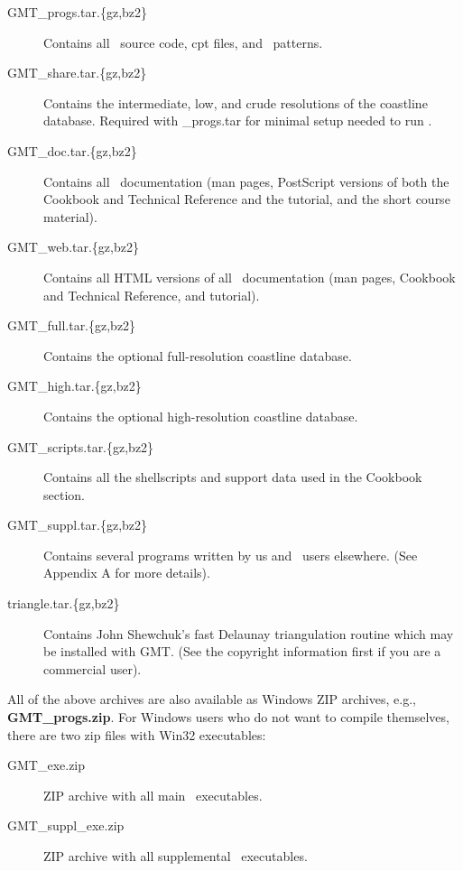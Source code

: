 \begin{description}

\item[GMT\_progs.tar.\{gz,bz2\}] Contains all \GMT\ source code,
cpt files, and \PS\ patterns.

\item [GMT\_share.tar.\{gz,bz2\}] Contains the intermediate,
low, and crude resolutions of the coastline database.  Required
with \_progs.tar for minimal setup needed to run \GMT.

\item[GMT\_doc.tar.\{gz,bz2\}] Contains all \GMT\ documentation
(man pages, PostScript versions of both the Cookbook and Technical
Reference and the tutorial, and the short course material).

\item[GMT\_web.tar.\{gz,bz2\}] Contains all HTML versions of all
\GMT\ documentation (man pages, Cookbook and Technical Reference,
and tutorial).

\item[GMT\_full.tar.\{gz,bz2\}] Contains the optional
full-resolution coastline database.

\item[GMT\_high.tar.\{gz,bz2\}] Contains the optional
high-resolution coastline database.

\item[GMT\_scripts.tar.\{gz,bz2\}] Contains all the shellscripts
and support data used in the Cookbook section.

\item[GMT\_suppl.tar.\{gz,bz2\}] Contains several programs
written by us and \GMT\ users elsewhere. (See Appendix A for more
details).

\item[triangle.tar.\{gz,bz2\}] Contains John Shewchuk's fast Delaunay
triangulation routine which may be installed with GMT. (See the copyright
information first if you are a commercial user).

\end{description}


All of the above archives are also available as Windows ZIP archives, e.g., {\bf GMT\_progs.zip}.
For Windows users who do not want to compile themselves, there are two zip files with Win32 executables:

\begin{description}

\item[GMT\_exe.zip] ZIP archive with all main \GMT\ executables.

\item[GMT\_suppl\_exe.zip] ZIP archive with all supplemental \GMT\ executables.

\end{description}


